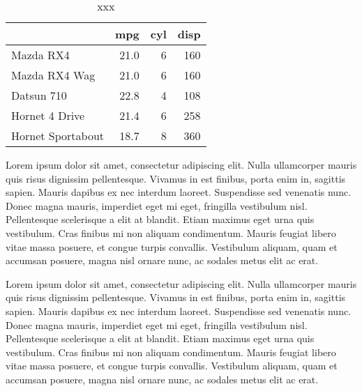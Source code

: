 \documentclass[]{article}
\newenvironment{Shaded}{\begin{snugshade}}{\end{snugshade}}
\newcommand{\KeywordTok}[1]{\textcolor[rgb]{0.13,0.29,0.53}{\textbf{{#1}}}}
\newcommand{\DataTypeTok}[1]{\textcolor[rgb]{0.13,0.29,0.53}{{#1}}}
\newcommand{\DecValTok}[1]{\textcolor[rgb]{0.00,0.00,0.81}{{#1}}}
\newcommand{\StringTok}[1]{\textcolor[rgb]{0.31,0.60,0.02}{{#1}}}
\newcommand{\NormalTok}[1]{{#1}}
\begin{document}

\begin{wraptable}{l}{6.6cm}

\caption{\label{tab:unnamed-chunk-2}xxx}
\centering
\fontsize{6}{8}\selectfont
\begin{tabular}[t]{lrrr}
\toprule
  & mpg & cyl & disp\\
\midrule
Mazda RX4 & 21.0 & 6 & 160\\
Mazda RX4 Wag & 21.0 & 6 & 160\\
Datsun 710 & 22.8 & 4 & 108\\
Hornet 4 Drive & 21.4 & 6 & 258\\
Hornet Sportabout & 18.7 & 8 & 360\\
\bottomrule
\end{tabular}
\end{wraptable}


Lorem ipsum dolor sit amet, consectetur adipiscing elit. Nulla
ullamcorper mauris quis risus dignissim pellentesque. Vivamus in est
finibus, porta enim in, sagittis sapien. Mauris dapibus ex nec interdum
laoreet. Suspendisse sed venenatis nunc. Donec magna mauris, imperdiet
eget mi eget, fringilla vestibulum nisl. Pellentesque scelerisque a elit
at blandit. Etiam maximus eget urna quis vestibulum. Cras finibus mi non
aliquam condimentum. Mauris feugiat libero vitae massa posuere, et
congue turpis convallis. Vestibulum aliquam, quam et accumsan posuere,
magna nisl ornare nunc, ac sodales metus elit ac erat.

Lorem ipsum dolor sit amet, consectetur adipiscing elit. Nulla
ullamcorper mauris quis risus dignissim pellentesque. Vivamus in est
finibus, porta enim in, sagittis sapien. Mauris dapibus ex nec interdum
laoreet. Suspendisse sed venenatis nunc. Donec magna mauris, imperdiet
eget mi eget, fringilla vestibulum nisl. Pellentesque scelerisque a elit
at blandit. Etiam maximus eget urna quis vestibulum. Cras finibus mi non
aliquam condimentum. Mauris feugiat libero vitae massa posuere, et
congue turpis convallis. Vestibulum aliquam, quam et accumsan posuere,
magna nisl ornare nunc, ac sodales metus elit ac erat.

\begin{Shaded}
\end{Shaded}
\end{document}
